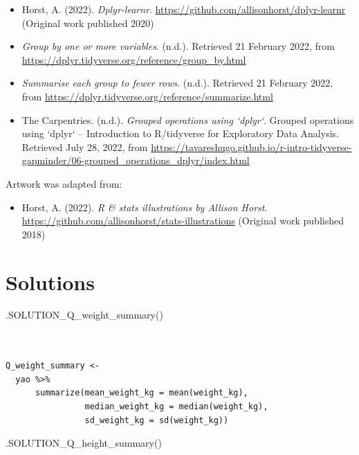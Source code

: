 \documentclass[
  letterpaper,
  DIV=11,
  numbers=noendperiod]{scrreprt}
\newenvironment{Shaded}{\begin{snugshade}}{\end{snugshade}}
\newcommand{\FunctionTok}[1]{\textcolor[rgb]{0.28,0.35,0.67}{#1}}
\newcommand{\NormalTok}[1]{\textcolor[rgb]{0.00,0.23,0.31}{#1}}
\providecommand{\tightlist}{%
  \setlength{\itemsep}{0pt}\setlength{\parskip}{0pt}}\usepackage{longtable,booktabs,array}
\begin{document}
\begin{itemize}
\item
  Horst, A. (2022). \emph{Dplyr-learnr}.
  \url{https://github.com/allisonhorst/dplyr-learnr} (Original work
  published 2020)
\item
  \emph{Group by one or more variables}. (n.d.). Retrieved 21 February
  2022, from \url{https://dplyr.tidyverse.org/reference/group_by.html}
\item
  \emph{Summarise each group to fewer rows}. (n.d.). Retrieved 21
  February 2022, from
  \url{https://dplyr.tidyverse.org/reference/summarize.html}
\item
  The Carpentries. (n.d.). \emph{Grouped operations using `dplyr`}.
  Grouped operations using `dplyr` -- Introduction to R/tidyverse for
  Exploratory Data Analysis. Retrieved July 28, 2022, from
  \url{https://tavareshugo.github.io/r-intro-tidyverse-gapminder/06-grouped_operations_dplyr/index.html}
\end{itemize}

Artwork was adapted from:

\begin{itemize}
\tightlist
\item
  Horst, A. (2022). \emph{R \& stats illustrations by Allison Horst}.
  \url{https://github.com/allisonhorst/stats-illustrations} (Original
  work published 2018)
\end{itemize}

\hypertarget{solutions-5}{%
\section{Solutions}\label{solutions-5}}

\begin{Shaded}
\begin{Highlighting}[]
\FunctionTok{.SOLUTION\_Q\_weight\_summary}\NormalTok{()}
\end{Highlighting}
\end{Shaded}

\begin{verbatim}


Q_weight_summary <- 
  yao %>%
      summarize(mean_weight_kg = mean(weight_kg),
                median_weight_kg = median(weight_kg),
                sd_weight_kg = sd(weight_kg))
\end{verbatim}

\begin{Shaded}
\begin{Highlighting}[]
\FunctionTok{.SOLUTION\_Q\_height\_summary}\NormalTok{()}
\end{Highlighting}
\end{Shaded}
\end{document}
